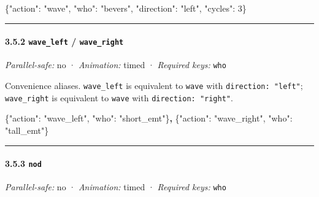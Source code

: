 \documentclass[
  11pt,
]{book}
\newenvironment{Shaded}{}{}
\newcommand{\DataTypeTok}[1]{\textcolor[rgb]{0.56,0.13,0.00}{#1}}
\newcommand{\DecValTok}[1]{\textcolor[rgb]{0.25,0.63,0.44}{#1}}
\newcommand{\ErrorTok}[1]{\textcolor[rgb]{1.00,0.00,0.00}{\textbf{#1}}}
\newcommand{\FunctionTok}[1]{\textcolor[rgb]{0.02,0.16,0.49}{#1}}
\newcommand{\StringTok}[1]{\textcolor[rgb]{0.25,0.44,0.63}{#1}}
\begin{document}
\begin{Shaded}
\begin{Highlighting}[]
\FunctionTok{\{}\DataTypeTok{"action"}\FunctionTok{:} \StringTok{"wave"}\FunctionTok{,} \DataTypeTok{"who"}\FunctionTok{:} \StringTok{"bevers"}\FunctionTok{,} \DataTypeTok{"direction"}\FunctionTok{:} \StringTok{"left"}\FunctionTok{,} \DataTypeTok{"cycles"}\FunctionTok{:} \DecValTok{3}\FunctionTok{\}}
\end{Highlighting}
\end{Shaded}

\begin{center}\rule{0.5\linewidth}{0.5pt}\end{center}

\paragraph{\texorpdfstring{3.5.2 \texttt{wave\_left} /
\texttt{wave\_right}}{3.5.2 wave\_left / wave\_right}}\label{wave_left-wave_right}

\emph{Parallel-safe:} no · \emph{Animation:} timed · \emph{Required
keys:} \texttt{who}

Convenience aliases. \texttt{wave\_left} is equivalent to \texttt{wave}
with \texttt{direction:\ "left"}; \texttt{wave\_right} is equivalent to
\texttt{wave} with \texttt{direction:\ "right"}.

\begin{Shaded}
\begin{Highlighting}[]
\FunctionTok{\{}\DataTypeTok{"action"}\FunctionTok{:} \StringTok{"wave\_left"}\FunctionTok{,}  \DataTypeTok{"who"}\FunctionTok{:} \StringTok{"short\_emt"}\FunctionTok{\}}\ErrorTok{,}
\FunctionTok{\{}\DataTypeTok{"action"}\FunctionTok{:} \StringTok{"wave\_right"}\FunctionTok{,} \DataTypeTok{"who"}\FunctionTok{:} \StringTok{"tall\_emt"}\FunctionTok{\}}
\end{Highlighting}
\end{Shaded}

\begin{center}\rule{0.5\linewidth}{0.5pt}\end{center}

\paragraph{\texorpdfstring{3.5.3 \texttt{nod}}{3.5.3 nod}}\label{nod}

\emph{Parallel-safe:} no · \emph{Animation:} timed · \emph{Required
keys:} \texttt{who}
\end{document}
